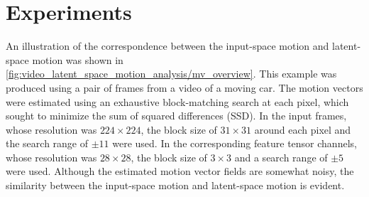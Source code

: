 \section{Experiments}
\label{sec:video_latent_space_motion_analysis/experiments}






%
%
%

An illustration of the correspondence between the input-space motion and latent-space motion was shown in \cref{fig:video_latent_space_motion_analysis/mv_overview}. This example was produced using a pair of frames from a video of a moving car.  The motion vectors were estimated using an exhaustive block-matching search at each pixel, which sought to minimize the sum of squared differences (SSD). In the input frames, whose resolution was $224 \times 224$, the block size of $31 \times 31$ around each pixel and
the search range of $\pm11$ were used. In the corresponding feature tensor channels, whose resolution was $28 \times 28$, the block size of $3 \times 3$ and a search range of $\pm5$ were used. Although the estimated motion vector fields are somewhat noisy, the similarity between the input-space motion and latent-space motion is evident.

